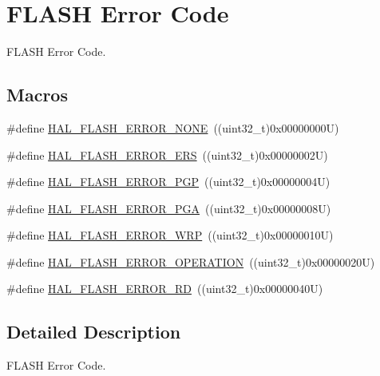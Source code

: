 \hypertarget{group___f_l_a_s_h___error___code}{}\section{F\+L\+A\+SH Error Code}
\label{group___f_l_a_s_h___error___code}


F\+L\+A\+SH Error Code.  


\subsection*{Macros}
\begin{DoxyCompactItemize}
\item 
\#define \mbox{\hyperlink{group___f_l_a_s_h___error___code_gae7fb9ee7198d393aba27ade3a9f50a70}{H\+A\+L\+\_\+\+F\+L\+A\+S\+H\+\_\+\+E\+R\+R\+O\+R\+\_\+\+N\+O\+NE}}~((uint32\+\_\+t)0x00000000\+U)
\item 
\#define \mbox{\hyperlink{group___f_l_a_s_h___error___code_ga53543cb5bd961dbc612e919d0558eea4}{H\+A\+L\+\_\+\+F\+L\+A\+S\+H\+\_\+\+E\+R\+R\+O\+R\+\_\+\+E\+RS}}~((uint32\+\_\+t)0x00000002\+U)
\item 
\#define \mbox{\hyperlink{group___f_l_a_s_h___error___code_ga4c79d30899d81069a5a7d36c9a008114}{H\+A\+L\+\_\+\+F\+L\+A\+S\+H\+\_\+\+E\+R\+R\+O\+R\+\_\+\+P\+GP}}~((uint32\+\_\+t)0x00000004\+U)
\item 
\#define \mbox{\hyperlink{group___f_l_a_s_h___error___code_gad9f62b6567543610f667bce580550662}{H\+A\+L\+\_\+\+F\+L\+A\+S\+H\+\_\+\+E\+R\+R\+O\+R\+\_\+\+P\+GA}}~((uint32\+\_\+t)0x00000008\+U)
\item 
\#define \mbox{\hyperlink{group___f_l_a_s_h___error___code_ga27e871d85f9311272098315bc3723075}{H\+A\+L\+\_\+\+F\+L\+A\+S\+H\+\_\+\+E\+R\+R\+O\+R\+\_\+\+W\+RP}}~((uint32\+\_\+t)0x00000010\+U)
\item 
\#define \mbox{\hyperlink{group___f_l_a_s_h___error___code_gafa1433e0ca2366478928c04244310d44}{H\+A\+L\+\_\+\+F\+L\+A\+S\+H\+\_\+\+E\+R\+R\+O\+R\+\_\+\+O\+P\+E\+R\+A\+T\+I\+ON}}~((uint32\+\_\+t)0x00000020\+U)
\item 
\#define \mbox{\hyperlink{group___f_l_a_s_h___error___code_ga33008f2ad5085cd4158dd260fb2d124d}{H\+A\+L\+\_\+\+F\+L\+A\+S\+H\+\_\+\+E\+R\+R\+O\+R\+\_\+\+RD}}~((uint32\+\_\+t)0x00000040\+U)
\end{DoxyCompactItemize}


\subsection{Detailed Description}
F\+L\+A\+SH Error Code. 



